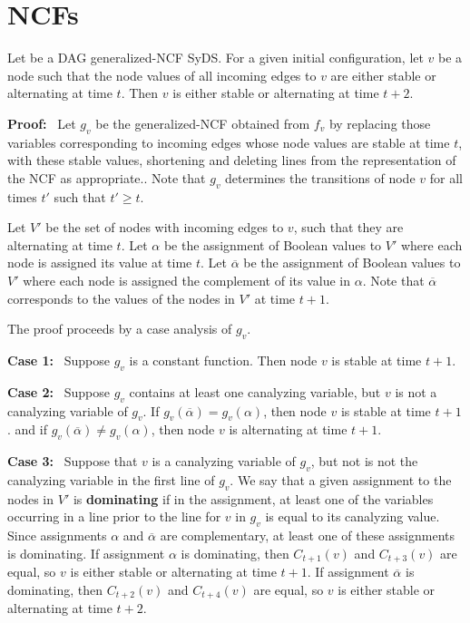 \section{NCFs}
\label{sec:ncfs}

\begin{lemma}\label{lem:ncf_plus_two}
Let \cals{} be a DAG generalized-NCF SyDS.
For a given initial configuration,
let $v$ be a node such that the node values of all incoming edges to $v$
are  either stable or alternating at time $t$.
Then  $v$ is either stable or alternating at time $t+2$.
\end{lemma}

\noindent
\textbf{Proof:}~ Let $g_v$ be the generalized-NCF obtained from $f_v$  
by replacing those variables corresponding to incoming edges 
whose node values are stable at time $t$,
with these stable values,
shortening and deleting lines from the representation of the NCF as appropriate.. 
Note that $g_v$ determines the transitions of node $v$ for all times $t'$ such that $t' \geq t$.

Let $V'$ be the set of nodes with incoming edges to $v$, such that they are alternating at time $t$.
Let $\alpha$  be the assignment of Boolean values to $V'$ 
where each node  is assigned its value at time $t$.
Let $\overline{\alpha}$  be the assignment of Boolean values to $V'$ 
where each node  is assigned the complement of its value in $\alpha$.
Note that $\overline{\alpha}$ corresponds to the values of the nodes in $V'$ at time $t+1$.


The proof proceeds by a case analysis of $g_v$.

\noindent
\textbf{Case 1:}~ Suppose $g_v$ is a constant function.
Then node $v$ is stable at time $t+1$.

\noindent
\textbf{Case 2:}~ Suppose $g_v$ contains at least one canalyzing variable, 
but $v$ is not a canalyzing variable of $g_v$.
If $g_v(\overline{\alpha}) = g_v(\alpha)$, then node $v$ is stable at time $t+1$.
and if $g_v(\overline{\alpha}) \neq g_v(\alpha)$, 
then node $v$ is alternating at time $t+1$.

\noindent
\textbf{Case 3:}~ Suppose that $v$ is a canalyzing variable of $g_v$, 
but not is not the canalyzing variable in the first line of $g_v$.
We say that a given assignment to the nodes in $V'$ is {\bf dominating} 
if in the assignment, at least one of the variables occurring in a line prior to the line for $v$ in $g_v$
is equal to its canalyzing value.
Since assignments $\alpha$  and $\overline{\alpha}$ are complementary,
at least one of these assignments is dominating.
If assignment $\alpha$  is dominating, then $C_{t+1}(v)$ and $C_{t+3}(v)$ are equal,
so $v$ is either stable or alternating at time $t+1$.
If assignment $\overline{\alpha}$  is dominating, then $C_{t+2}(v)$ and $C_{t+4}(v)$ are equal,
so $v$ is either stable or alternating at time $t+2$.

